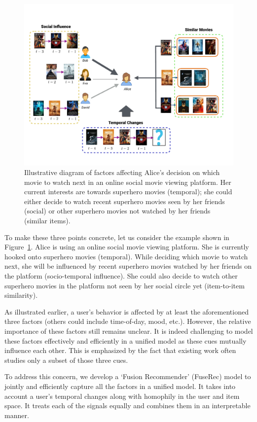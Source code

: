 \begin{figure}[tbh]
  \centering
  \includegraphics[width=\linewidth]{figures/Idea}
  \caption{Illustrative diagram of factors affecting Alice's decision on which movie to watch next in an online social movie viewing platform. Her current interests are towards superhero movies (temporal); she could either decide to watch recent superhero movies seen by her friends (social) or other superhero movies not watched by her friends (similar items).}
  \label{fig:Idea}
\end{figure}

To make these three points concrete, let us consider the example shown in Figure~\ref{fig:Idea}. Alice is using an online social movie viewing platform. She is currently hooked onto superhero movies (temporal). While deciding which movie to watch next, she will be influenced by recent superhero movies watched by her friends on the platform (socio-temporal influence). She could also decide to watch other superhero movies in the platform not seen by her social circle yet (item-to-item similarity).

As illustrated earlier, a user's behavior is affected by at least
the aforementioned three factors (others could include time-of-day, mood, etc.). However, the relative importance of these factors still remains unclear. It is indeed challenging to model these factors effectively and efficiently in a unified model as these cues mutually influence each other.
This is emphasized by the fact that existing work often studies only a subset of those three cues.

To address this concern, we develop a `Fusion Recommender' (FuseRec) model to jointly and efficiently capture all the factors in a unified model. It takes into account a user's temporal changes along with homophily in the user and item space. It treats each of the signals equally and combines them in an interpretable manner.

